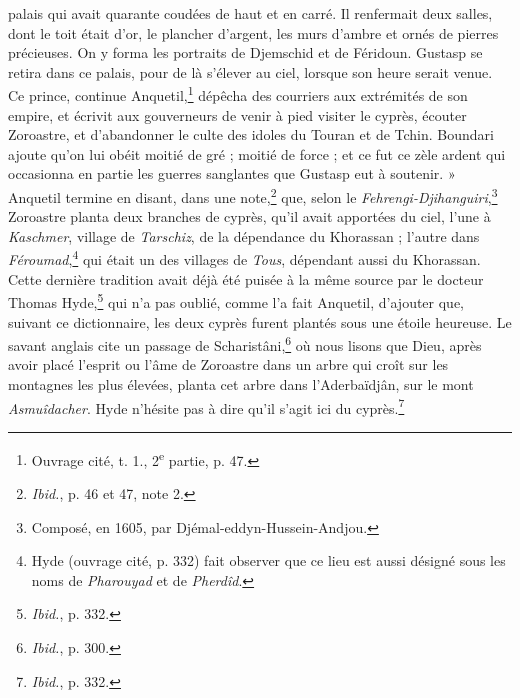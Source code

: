 \documentclass[a4paper, 11pt, oneside, polutonikogreek, french]{article}
\begin{document}
palais qui avait quarante coudées de haut et en carré. Il renfermait deux salles, dont le toit était d'or, le plancher d'argent, les murs d'ambre et ornés de pierres précieuses. On y forma les portraits de Djemschid et de Féridoun. Gustasp se retira dans ce palais, pour de là s'élever au ciel, lorsque son heure serait venue. Ce prince, continue Anquetil,\footnote{Ouvrage cité, t. 1., 2\textsuperscript{e} partie, p. 47.} dépêcha des courriers aux extrémités de son empire, et écrivit aux gouverneurs de venir à pied visiter le cyprès, écouter Zoroastre, et d'abandonner le culte des idoles du Touran et de Tchin. Boundari ajoute qu'on lui obéit moitié de gré ; moitié de force ; et ce fut ce zèle ardent qui occasionna en partie les guerres sanglantes que Gustasp eut à soutenir. » Anquetil termine en disant, dans une note,\footnote{\emph{Ibid.}, p. 46 et 47, note 2.} que, selon le \emph{Fehrengi-Djihanguiri},\footnote{Composé, en 1605, par Djémal-eddyn-Hussein-Andjou.} Zoroastre planta deux branches de cyprès, qu'il avait apportées du ciel, l'une à \emph{Kaschmer}, village de \emph{Tarschiz}, de la dépendance du Khorassan ; l'autre dans \emph{Féroumad},\footnote{Hyde (ouvrage cité, p. 332) fait observer que ce lieu est aussi désigné sous les noms de \emph{Pharouyad} et de \emph{Pherdîd}.} qui était un des villages de \emph{Tous}, dépendant aussi du Khorassan. Cette dernière tradition avait déjà été puisée à la même source par le docteur Thomas Hyde,\footnote{\emph{Ibid.}, p. 332.} qui n'a pas oublié, comme l'a fait Anquetil, d'ajouter que, suivant ce dictionnaire, les deux cyprès furent plantés sous une étoile heureuse. Le savant anglais cite un passage de Scharistâni,\footnote{\emph{Ibid.}, p. 300.} où nous lisons que Dieu, après avoir placé l'esprit ou l'âme de Zoroastre dans un arbre qui croît sur les montagnes les plus élevées, planta cet arbre dans l'Aderbaïdjân, sur le mont \emph{Asmuîdacher}. Hyde n'hésite pas à dire qu'il s'agit ici du cyprès.\footnote{\emph{Ibid.}, p. 332.}
\end{document}
